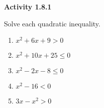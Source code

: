 \vspace{1ex}
\noindent\textbf{Activity 1.8.1}

\vspace{0.75ex}

Solve each quadratic inequality. 
\begin{enumerate}[label = \color{blue}\arabic*. ]
\item $ x^{2} + 6x + 9 > 0 $
\item $ x^{2} + 10x + 25 \leq 0 $
\item $ x^{2} - 2x - 8 \leq 0 $
\item $ x^{2} - 16 < 0 $
\item $ 3x - x^{2} > 0 $
\end{enumerate}
